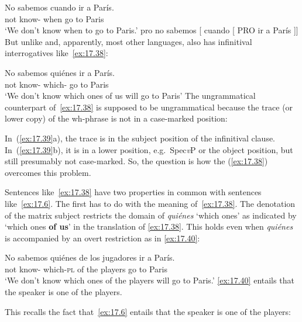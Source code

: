\documentclass[output=paper]{langsci/langscibook}
\begin{document}
\ea\label{ex:17.37}
    \ea
    \gll    No sabemos cuando ir a París.\\
            not know-\Fpl{} when  go to Paris    \\
    \glt    ‘We don’t know when to go to Paris.’
    \ex     pro no sabemos [ cuando [ PRO  ir a París ]]
    \z
\z
But unlike  and, apparently, most other languages,  also has
infinitival interrogatives like~\eqref{ex:17.38}:

\ea\label{ex:17.38}
    \gll    No sabemos quiénes ir a París.\\
            not  know-\Fpl{} which-\Pl{} go to Paris\\
    \glt    ‘We don’t know which ones of us will go to Paris’
\z
The ungrammatical  counterpart of~\eqref{ex:17.38} is supposed to be
ungrammatical because the trace (or lower copy) of the wh-phrase is not in a
case-marked position:

\ea\label{ex:17.39}
    \z
\z
In~(\ref{ex:17.39}a), the trace is in the subject position of the infinitival
clause. In~(\ref{ex:17.39}b), it is in a lower position, e.g.\ Spec\emph{v}P
or the object position, but still presumably not case-marked. So, the question
is how the  (\ref{ex:17.38}) overcomes this problem.

Sentences like~\eqref{ex:17.38} have two properties in common with
sentences like~\eqref{ex:17.6}. The first has to do with the meaning
of~\eqref{ex:17.38}.  The denotation of the matrix subject restricts the
domain of \emph{quiénes} ‘which ones’ as indicated by ‘which ones \textbf{of
us}’ in the translation of \eqref{ex:17.38}. This holds even when
\emph{quiénes} is accompanied by an overt restriction as in
\eqref{ex:17.40}:

\ea\label{ex:17.40}
    \gll    No sabemos quiénes de los jugadores ir a París.\\
            not know-\Fpl{} which-\textsc{pl} of the players go to Paris\\
    \glt    ‘We don’t know which ones of the players will go to Paris.’
\z
\eqref{ex:17.40} entails that the speaker is one of the players.

This recalls the fact that~\eqref{ex:17.6} entails that the speaker is one of
the players:
\end{document}
